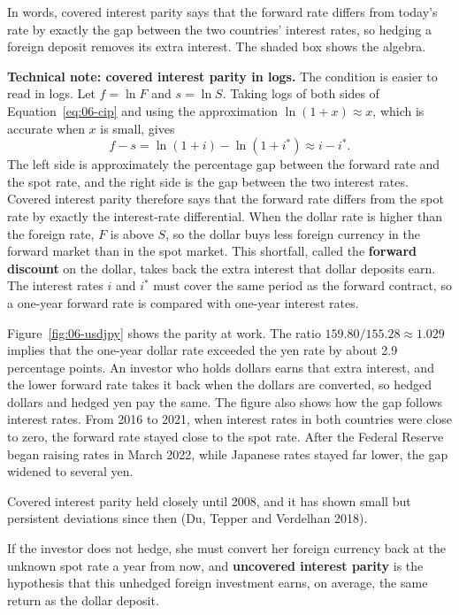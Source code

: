 In words, covered interest parity says that the forward rate differs from today's rate by exactly the gap between the two countries' interest rates, so hedging a foreign deposit removes its extra interest. The shaded box shows the algebra.

\begin{technote}
\textbf{Technical note: covered interest parity in logs.} The condition is easier to read in logs. Let $f = \ln F$ and $s = \ln S$. Taking logs of both sides of Equation~\eqref{eq:06-cip} and using the approximation $\ln(1+x) \approx x$, which is accurate when $x$ is small, gives
\begin{equation}
  f - s = \ln(1+i) - \ln(1+i^*) \approx i - i^*.
  \label{eq:06-cip-log}
\end{equation}
The left side is approximately the percentage gap between the forward rate and the spot rate, and the right side is the gap between the two interest rates. Covered interest parity therefore says that the forward rate differs from the spot rate by exactly the interest-rate differential. When the dollar rate is higher than the foreign rate, $F$ is above $S$, so the dollar buys less foreign currency in the forward market than in the spot market. This shortfall, called the \textbf{forward discount} on the dollar, takes back the extra interest that dollar deposits earn. The interest rates $i$ and $i^*$ must cover the same period as the forward contract, so a one-year forward rate is compared with one-year interest rates.
\end{technote}


Figure~\ref{fig:06-usdjpy} shows the parity at work. The ratio $159.80/155.28 \approx 1.029$ implies that the one-year dollar rate exceeded the yen rate by about 2.9 percentage points. An investor who holds dollars earns that extra interest, and the lower forward rate takes it back when the dollars are converted, so hedged dollars and hedged yen pay the same. The figure also shows how the gap follows interest rates. From 2016 to 2021, when interest rates in both countries were close to zero, the forward rate stayed close to the spot rate. After the Federal Reserve began raising rates in March 2022, while Japanese rates stayed far lower, the gap widened to several yen.

Covered interest parity held closely until 2008, and it has shown small but persistent deviations since then (Du, Tepper and Verdelhan 2018).

If the investor does not hedge, she must convert her foreign currency back at the unknown spot rate a year from now, and \textbf{uncovered interest parity} is the hypothesis that this unhedged foreign investment earns, on average, the same return as the dollar deposit.

